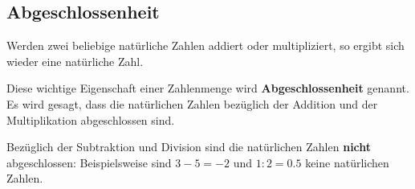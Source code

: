 \subsection{Abgeschlossenheit}

Werden zwei beliebige natürliche Zahlen addiert oder multipliziert, so ergibt sich wieder eine natürliche Zahl.

Diese wichtige Eigenschaft einer Zahlenmenge wird \textbf{Abgeschlossenheit} genannt. Es wird gesagt, dass die natürlichen Zahlen bezüglich der Addition und der Multiplikation abgeschlossen sind.

Bezüglich der Subtraktion und Division sind die natürlichen Zahlen \textbf{nicht} abgeschlossen: Beispielsweise sind $3-5 = -2$ und $1:2 = 0.5$ keine natürlichen Zahlen.
